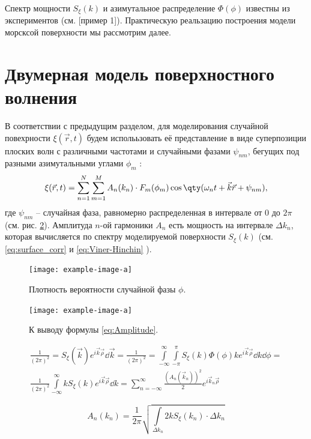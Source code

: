 \documentclass[a4paper,14pt]{extarticle}
\begin{document}
Спектр мощности $S_\xi(k)$ и азимутальное распределение  $\Phi(\phi)$ известны
из экспериментов (см. [пример 1]). Практическую реальзацию построения модели
морсксой поверхности мы рассмотрим далее.

\section{Двумерная модель поверхностного волнения}%
\label{sec:dvumernaia_model_poverkhnostnogo_volneniia}

В соответствии с предыдущим разделом, для моделирования случайной повехрности
$\xi(\vec r,t)$ будем исполььзовать её представление в виде суперпозиции
плоских волн с различными частотами и случайными фазами $\psi_{nm}$, бегущих
под разными азимутальными углами $\phi_m$ \cite{kekke}:
\begin{equation}
    \label{eq:surface2d}
    \xi(\vec r,t) = \sum\limits_{n=1}^{N} \sum\limits_{m=1}^{M} A_n(k_n) \cdot
    F_m(\phi_m) \cos \qty(\omega_n t + \vec k \vec r + \psi_{nm}),
\end{equation}
где $\psi_{nm}$ -- случайная фаза, равномерно распределенная в интервале от $0$
до $2 \pi$ (см. рис. \ref{fig:phase}). Амплитуда $n$-ой гармоники $A_n$ есть
мощность на интервале $\Delta k_n$, которая вычисляется по спектру моделируемой
поверхности $S_\xi(k)$ (см. \eqref{eq:surface_corr} и \eqref{eq:Viner-Hinchin}
).
\begin{figure}[h!]
    \centering
    \texttt{[image: example-image-a]}
    \caption{Плотность вероятности случайной фазы $\phi$.}
    \label{fig:phase}
\end{figure}
\begin{figure}[h!]
    \centering
    \texttt{[image: example-image-a]}
    \caption{К выводу формулы \eqref{eq:Amplitude}.}
    \label{fig:phase}
\end{figure}
\begin{gather}
    \frac{1}{(2 \pi)^2} = S_{\xi}(\vec k) e^{i \vec k \vec \rho} \dd \vec k = 
    \frac{1}{(2 \pi)^2} = 
        \int\limits_{-\infty}^{\infty}
        \int\limits_{- \pi}^{\pi} 
    S_\xi(k) \Phi(\phi) k e^{i \vec k\vec \rho} \dd k \dd \phi = \\
    \frac{1}{(2 \pi)^2} \int\limits_{-\infty}^{\infty} k S_\xi (k) e^{i \vec k
    \vec \rho} \dd k = \sum\limits_{n=-\infty}^{\infty} \frac{(A_n(\vec
k_n))^2}{2} e^{i \vec k_n \vec \rho} 
\end{gather}

\begin{equation}
    \label{eq:Amplitude}
    A_n(k_n) = \frac{1}{2 \pi} \sqrt{\int\limits_{\Delta k_n} 2 k S_\xi(k_n)
    \cdot \Delta k_n}
\end{equation}
\end{document}
